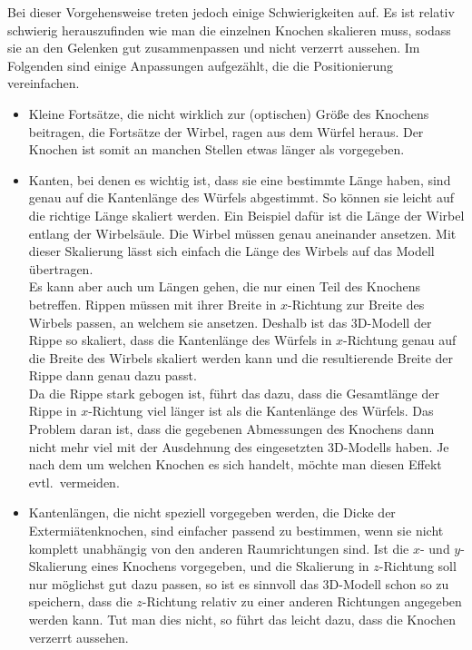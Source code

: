 Bei dieser Vorgehensweise treten jedoch einige Schwierigkeiten auf. Es ist \zb  relativ schwierig herauszufinden wie man die einzelnen Knochen skalieren muss, sodass sie an den Gelenken gut zusammenpassen und nicht verzerrt aussehen. Im Folgenden sind einige Anpassungen aufgezählt, die die Positionierung vereinfachen.
\begin{itemize}
 \item Kleine Fortsätze, die nicht wirklich zur (optischen) Größe des Knochens beitragen, \zb die Fortsätze der Wirbel, ragen aus dem Würfel heraus. Der Knochen ist somit an manchen Stellen etwas länger als vorgegeben.
 
 \item Kanten, bei denen es wichtig ist, dass sie eine bestimmte Länge haben, sind genau auf die Kantenlänge des Würfels abgestimmt. So können sie leicht auf die richtige Länge skaliert werden. 
 Ein Beispiel dafür ist die Länge der Wirbel entlang der Wirbelsäule. Die Wirbel müssen genau aneinander ansetzen. Mit dieser Skalierung lässt sich einfach die Länge des Wirbels auf das Modell übertragen.\\
 Es kann aber auch um Längen gehen, die nur einen Teil des Knochens betreffen.
 Rippen müssen \zb mit ihrer Breite in $x$-Richtung zur Breite des Wirbels passen, an welchem sie ansetzen. Deshalb ist das 3D-Modell der Rippe so skaliert, dass die Kantenlänge des Würfels in $x$-Richtung genau auf die Breite des Wirbels skaliert werden kann und die resultierende Breite der Rippe dann genau dazu passt.\\
 Da die Rippe stark gebogen ist, führt das dazu, dass die Gesamtlänge der Rippe in $x$-Richtung viel länger ist als die Kantenlänge des Würfels. Das Problem daran ist, dass die gegebenen Abmessungen des Knochens dann nicht mehr viel mit der Ausdehnung des eingesetzten 3D-Modells haben. Je nach dem um welchen Knochen es sich handelt, möchte man diesen Effekt evtl.\ vermeiden.
 
 \item Kantenlängen, die nicht speziell vorgegeben werden, \zb die Dicke der Extermiätenknochen, sind einfacher passend zu bestimmen, wenn sie nicht komplett unabhängig von den anderen Raumrichtungen sind. Ist \zb die $x$- und $y$-Skalierung eines Knochens vorgegeben, und die Skalierung in $z$-Richtung soll nur möglichst gut dazu passen, so ist es sinnvoll das 3D-Modell schon so zu speichern, dass die $z$-Richtung relativ zu einer anderen Richtungen angegeben werden kann. Tut man dies nicht, so führt das leicht dazu, dass die Knochen verzerrt aussehen.
\end{itemize}


